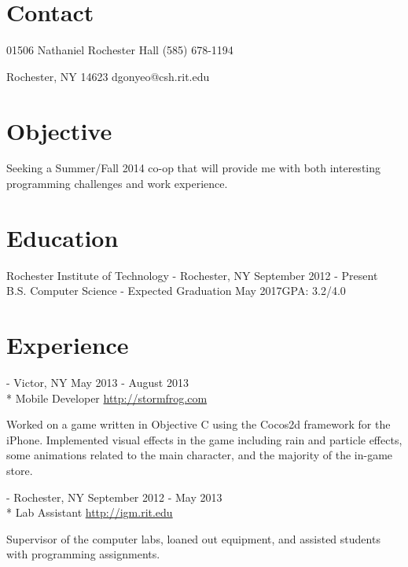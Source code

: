 \documentclass[letterpaper,margin,line,11pt]{resume}
\newcommand{\rurl}[1]{\hfill {\footnotesize \url{#1}}}
\newcommand{\rdate}[1]{\hfill {\small #1}}
\renewcommand{\employer}[5]{\item[#1] - #2 \rdate{#3} \\* #4 \rurl{#5}}
\begin{document}
\begin{resume}
\section{\mysidestyle Contact} 
	\begin{asparablank}
		\item 01506 Nathaniel Rochester Hall \hfill (585) 678-1194
		\item Rochester, NY 14623 \hfill dgonyeo@csh.rit.edu
	\end{asparablank}

\section{\mysidestyle Objective}
	Seeking a Summer/Fall 2014 co-op that will provide me with both interesting programming challenges and work experience.

\section{\mysidestyle Education}
	\begin{compactdesc}
		\item[Rochester Institute of Technology] - Rochester, NY \rdate{September 2012 - Present}
		\small
		\\B.S. Computer Science  - Expected Graduation May 2017\hfill GPA: 3.2/4.0
	\end{compactdesc}

\section{\mysidestyle Experience}
	\begin{asparadesc}
		\employer{Stormfrog}{Victor, NY}{May 2013 - August 2013}{Mobile Developer}{http://stormfrog.com}

		\small
		Worked on a game written in Objective C using the Cocos2d framework for the iPhone. Implemented visual effects in the game including rain and particle effects, some animations related to the main character, and the majority of the in-game store.
		\normalsize
		\\
		\employer{Interactive Games and Media at RIT}{Rochester, NY}{September 2012 - May 2013}{Lab Assistant}{http://igm.rit.edu}

		\small
		Supervisor of the computer labs, loaned out equipment, and assisted students with programming assignments.
	\end{asparadesc}


\end{resume}
\end{document}
